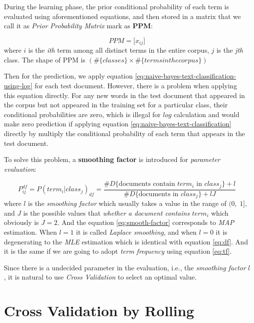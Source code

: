 \documentclass{article}
\begin{document}
During the learning phase, the prior conditional probability of each term is evaluated using aforementioned equations, and then stored in a matrix that we call it as \textit{Prior Probability Matrix} mark as \textbf{PPM}:

\begin{equation} \label{eq:ppm}
	PPM = \big[  x_{ij}  \big]
\end{equation}
 where $i$ is the \textit{ith} term among all distinct terms in the entire corpus, $j$ is the \textit{jth} class. The shape of PPM is $(\#\{classes\} \times \#\{terms in the corpus\} )$

Then for the prediction, we apply equation \ref{eq:naive-bayes-text-classification-using-log} for each test document. However, there is a problem when applying this equation directly. For any new words in the test document that appeared in the corpus but not appeared in the training set for a particular class, their conditional probabilities are zero, which is illegal for $log$ calculation and would make zero prediction if applying equation \ref{eq:naive-bayes-text-classification} directly by multiply the conditional probability of each term that appears in the test document.

To solve this problem, a \textbf{smoothing factor} is introduced for \textit{parameter evaluation}:

\begin{equation} \label{eq:smooth-factor}
	P_{ij}^{df}=P(term_i|class_j)_{df}=\frac
	{\#D\{\text{documents contain $term_i$ in $class_j$}\} + l }
	{\#D\{\text{documents in $class_j$}\} + lJ}
\end{equation}
where $l$ is the \textit{smoothing factor} which usually takes a value in the range of $(0, \; 1]$, and $J$ is the possible values that \textit{whether a document contains $term_i$} which obviously is $J=2$. And the equation \ref{eq:smooth-factor} corresponds to \textit{MAP} estimation. When $l=1$ it is called \textit{Laplace smoothing}, and when $l=0$ it is degenerating to the \textit{MLE} estimation which is identical with equation \ref{eq:df}. And it is the same if we are going to adopt \textit{term frequency} using equation \ref{eq:tf}.

Since there is a undecided parameter in the evaluation, i.e., the \textit{smoothing factor} $l$, it is natural to use \textit{Cross Validation} to select an optimal value.

\section{Cross Validation by Rolling}
\end{document}

